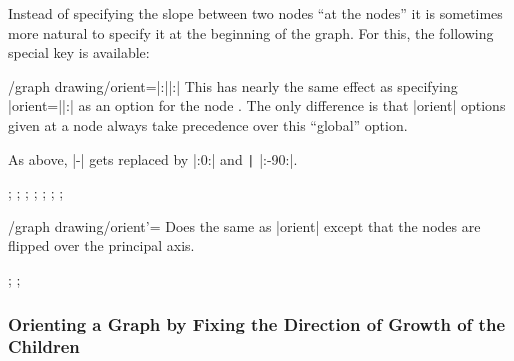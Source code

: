 Instead of specifying the slope between two nodes ``at the nodes'' it 
is sometimes more natural to specify it at the beginning of the
graph. For this, the following special key is available:

\begin{key}{/graph drawing/orient=|:||:|}
  This has nearly the same effect as specifying
  |orient=||:| as an option for the node
  . The only difference is that |orient| options given at
  a node always take precedence over this ``global'' option.

  As above, |-| gets replaced by
  |:0:| and \verb!|!
  |:-90:|.
\begin{codeexample}[]
\tikz {};
\tikz {};
\tikz {};
\tikz {};
\tikz {};
\tikz {};
\tikz {};
\end{codeexample}
\end{key}

\begin{key}{/graph drawing/orient'=}
  Does the same as |orient| except that the nodes are flipped over the
  principal axis.
\begin{codeexample}[]
\tikz {};
\tikz {};
\end{codeexample}
\end{key}



\subsubsection{Orienting a Graph by Fixing the Direction of Growth of the Children}

